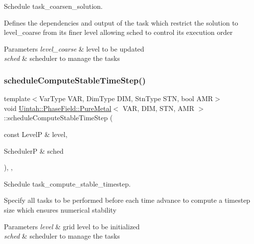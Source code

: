 Schedule task\+\_\+coarsen\+\_\+solution. 

Defines the dependencies and output of the task which restrict the solution to level\+\_\+coarse from its finer level allowing sched to control its execution order


\begin{DoxyParams}{Parameters}
{\em level\+\_\+coarse} & level to be updated \\
\hline
{\em sched} & scheduler to manage the tasks \\
\hline
\end{DoxyParams}
\mbox{\label{classUintah_1_1PhaseField_1_1PureMetal_aa8315804eb12ca8eaf7dbe2bed83922e}} 
\subsubsection{\texorpdfstring{schedule\+Compute\+Stable\+Time\+Step()}{scheduleComputeStableTimeStep()}}
{\footnotesize\ttfamily template$<$Var\+Type V\+AR, Dim\+Type D\+IM, Stn\+Type S\+TN, bool A\+MR$>$ \\
void \hyperlink{classUintah_1_1PhaseField_1_1PureMetal}{Uintah\+::\+Phase\+Field\+::\+Pure\+Metal}$<$ V\+AR, D\+IM, S\+TN, A\+MR $>$\+::schedule\+Compute\+Stable\+Time\+Step (\begin{DoxyParamCaption}\item[{const LevelP \&}]{level,  }\item[{SchedulerP \&}]{sched }\end{DoxyParamCaption})\hspace{0.3cm}{\ttfamily [override]}, {\ttfamily [protected]}, {\ttfamily [virtual]}}



Schedule task\+\_\+compute\+\_\+stable\+\_\+timestep. 

Specify all tasks to be performed before each time advance to compute a timestep size which ensures numerical stability


\begin{DoxyParams}{Parameters}
{\em level} & grid level to be initialized \\
\hline
{\em sched} & scheduler to manage the tasks \\
\hline
\end{DoxyParams}
\mbox{\label{classUintah_1_1PhaseField_1_1PureMetal_a3c662077070517adee6f60b1b7a26039}} 
